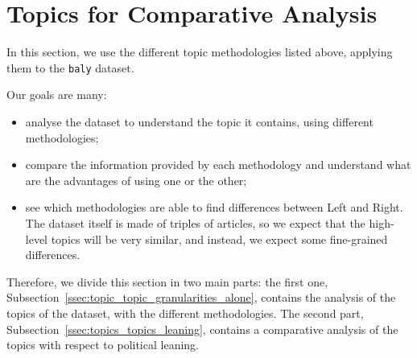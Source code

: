 




\section{\statusgreen Topics for Comparative Analysis}
\label{sec:topic_topic_granularities}

In this section, we use the different topic methodologies listed above, applying them to the \texttt{baly} dataset.

Our goals are many:

\begin{itemize}
    \item analyse the dataset to understand the topic it contains, using different methodologies;
    \item compare the information provided by each methodology and understand what are the advantages of using one or the other;
    \item see which methodologies are able to find differences between Left and Right. The dataset itself is made of triples of articles, so we expect that the high-level topics will be very similar, and instead, we expect some fine-grained differences.
\end{itemize}

Therefore, we divide this section in two main parts: the first one, Subsection~\ref{ssec:topic_topic_granularities_alone}, contains the analysis of the topics of the dataset, with the different methodologies. The second part, Subsection~\ref{ssec:topics_topics_leaning}, contains a comparative analysis of the topics with respect to political leaning.

